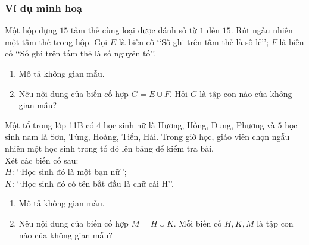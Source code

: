 \subsubsection{Ví dụ minh hoạ}
\begin{vd}%
	Một hộp đựng $15$ tấm thẻ cùng loại được đánh số từ $1$ đến $15$. Rút ngẫu nhiên một tấm thẻ trong hộp. Gọi $E$ là biến cố \lq\lq  Số ghi trên tấm thẻ là số lẻ\rq\rq; $F$ là biến cố \lq\lq  Số ghi trên tấm thẻ là số nguyên tố\rq\rq.
	\begin{enumerate}
		\item Mô tả không gian mẫu.
		\item Nêu nội dung của biến cố hợp $G=E \cup F$. Hỏi $G$ là tập con nào của không gian mẫu?
	\end{enumerate}
\end{vd}
\begin{vd}%
	Một tổ trong lớp 11B có $4$ học sinh nữ là Hương, Hồng, Dung, Phương và $5$ học sinh nam là Sơn, Tùng, Hoàng, Tiến, Hải. Trong giờ học, giáo viên chọn ngẫu nhiên một học sinh trong tổ đó lên bảng để kiểm tra bài.\\
	Xét các biến cố sau:\\
	$H$: \lq\lq  Học sinh đó là một bạn nữ\rq\rq;\\
	$K$: \lq\lq  Học sinh đó có tên bắt đầu là chữ cái $\mathrm{H}$\rq\rq.
	\begin{enumerate}
		\item Mô tả không gian mẫu.
		\item Nêu nội dung của biến cố hợp $M=H \cup K$. Mỗi biến cố $H, K, M$ là tập con nào của không gian mẫu?
	\end{enumerate}
\end{vd}
